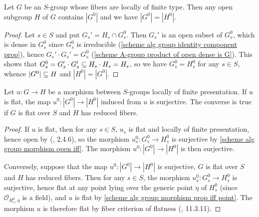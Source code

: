 \begin{lemma}\label{scheme group fiber ft open subgruop identity component equal}
Let $G$ be an $S$-group whose fibers are locally of finite type. Then any open subgroup $H$ of $G$ contains $|G^0|$ and we have $|G^0|=|H^0|$.
\end{lemma}
\begin{proof}
Let $s\in S$ and put $G_s'=H_s\cap G^0_s$. Then $G_s'$ is an open subset of $G_s^0$, which is dense in $G^0_s$ since $G_s^0$ is irreducible (\cref{scheme alg group identity component prop}), hence $G_s'\cdot G_s'=G^0_s$ (\cref{scheme A-group product of open dense is G}). This shows that $G^0_s=G'_s\cdot G_s'\subseteq H_s\cdot H_s=H_s$, so we have $G_s^0=H_s^0$ for any $s\in S$, whence $|G^0|\subseteq H$ and $|H^0|=|G^0|$.
\end{proof}

\begin{proposition}\label{scheme group local fp morphism flat iff identity component surjective}
Let $u:G\to H$ be a morphism between $S$-groups locally of finite presentation. If $u$ is flat, the map $u^0:|G^0|\to|H^0|$ induced from $u$ is surjective. The converse is true if $G$ is flat over $S$ and $H$ has reduced fibers.
\end{proposition}
\begin{proof}
If $u$ is flat, then for any $s\in S$, $u_s$ is flat and locally of finite presentation, hence open by (\cite{EGA4-2}, 2.4.6), so the morphism $u^0_s:G^0_s\to H^0_s$ is surjective by \cref{scheme alg group morphism open iff}. The morphism $u^0:|G^0|\to|H^0|$ is then surjective.\par
Conversely, suppose that the map $u^0:|G^0|\to|H^0|$ is surjective, $G$ is flat over $S$ and $H$ has reduced fibers. Then for any $s\in S$, the morphism $u^0_s:G^0_s\to H^0_s$ is surjective, hence flat at any point lying over the generic point $\eta$ of $H^0_s$ (since $\mathscr{O}_{H^0_s,\eta}$ is a field), and $u$ is flat by \cref{scheme alg group morphism prop iff point}. The morphism $u$ is therefore flat by fiber criterion of flatness (\cite{EGA4-3}, 11.3.11).
\end{proof}

